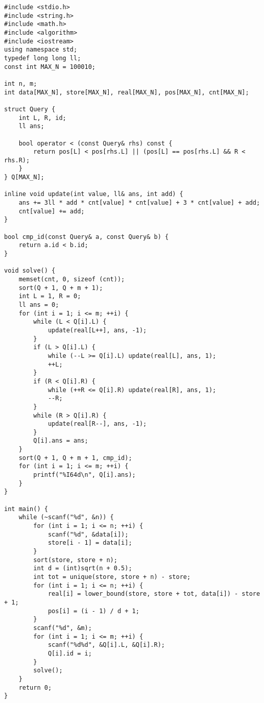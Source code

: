 \begin{lstlisting}
#include <stdio.h>
#include <string.h>
#include <math.h>
#include <algorithm>
#include <iostream>
using namespace std;
typedef long long ll;
const int MAX_N = 100010;

int n, m;
int data[MAX_N], store[MAX_N], real[MAX_N], pos[MAX_N], cnt[MAX_N];

struct Query {
	int L, R, id;
	ll ans;

	bool operator < (const Query& rhs) const {
		return pos[L] < pos[rhs.L] || (pos[L] == pos[rhs.L] && R < rhs.R);
	}
} Q[MAX_N];

inline void update(int value, ll& ans, int add) {
	ans += 3ll * add * cnt[value] * cnt[value] + 3 * cnt[value] + add;
	cnt[value] += add;
}

bool cmp_id(const Query& a, const Query& b) {
	return a.id < b.id;
}

void solve() {
	memset(cnt, 0, sizeof (cnt));
	sort(Q + 1, Q + m + 1);
	int L = 1, R = 0;
	ll ans = 0;
	for (int i = 1; i <= m; ++i) {
		while (L < Q[i].L) {
			update(real[L++], ans, -1);
		}
		if (L > Q[i].L) {
			while (--L >= Q[i].L) update(real[L], ans, 1);
			++L;
		}
		if (R < Q[i].R) {
			while (++R <= Q[i].R) update(real[R], ans, 1);
			--R;
		}
		while (R > Q[i].R) {
			update(real[R--], ans, -1);
		}
		Q[i].ans = ans;
	}
	sort(Q + 1, Q + m + 1, cmp_id);
	for (int i = 1; i <= m; ++i) {
		printf("%I64d\n", Q[i].ans);
	}
}

int main() {
	while (~scanf("%d", &n)) {
		for (int i = 1; i <= n; ++i) {
			scanf("%d", &data[i]);
			store[i - 1] = data[i];
		}
		sort(store, store + n);
		int d = (int)sqrt(n + 0.5);
		int tot = unique(store, store + n) - store;
		for (int i = 1; i <= n; ++i) {
			real[i] = lower_bound(store, store + tot, data[i]) - store + 1;
			pos[i] = (i - 1) / d + 1;
		}	
		scanf("%d", &m);
		for (int i = 1; i <= m; ++i) {
			scanf("%d%d", &Q[i].L, &Q[i].R);
			Q[i].id = i;
		}
		solve();
	}
    return 0;
}
\end{lstlisting}

